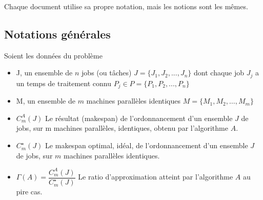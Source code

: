 \documentclass[a4paper,12pt]{report}
\theoremstyle{plain}				%
\theoremstyle{definition}				%
\newcommand\problemGrahamPm{$P_m||C_{\max}$\xspace}
\newcommand{\tdi}[1]{\todo[inline]{{#1}}{}}
\newcommand{\lp}[1]{\todo[author=LP,color=yellow,inline]{#1}}
\begin{document}
Chaque document utilise sa propre notation, mais les notions sont les mêmes.


\subsection{Notations générales}
Soient les données du problème

\begin{itemize}
\item J, un ensemble de $n$ jobs (ou tâches) 
	$J = \{J_1, J_2, ..., J_n\}$ 
dont chaque job $J_j$ a un temps de traitement connu 
	$P_j \in P = \{P_1, P_2, ..., P_n\}$

\item M, un ensemble de $m$ machines parallèles identiques 
	$M = \{M_1, M_2, \ldots, M_m\}$



\item $C_m^A(J)$ Le résultat (makespan) de l'ordonnancement 
	d'un ensemble $J$ de jobs, 
	sur m machines parallèles, identiques, 
	obtenu par l'algorithme $A$.

\item $C_m^\star(J)$ Le makespan optimal, idéal, de l'ordonnancement 
	d'un ensemble $J$ de jobs, 
	sur $m$ machines parallèles identiques.
\item $\Gamma(A)=\dfrac{C_m^A(J)}{C_m^\star(J)}$ 
	Le ratio d'approximation atteint par l'algorithme $A$ au pire cas.

\end{itemize}
\end{document}
